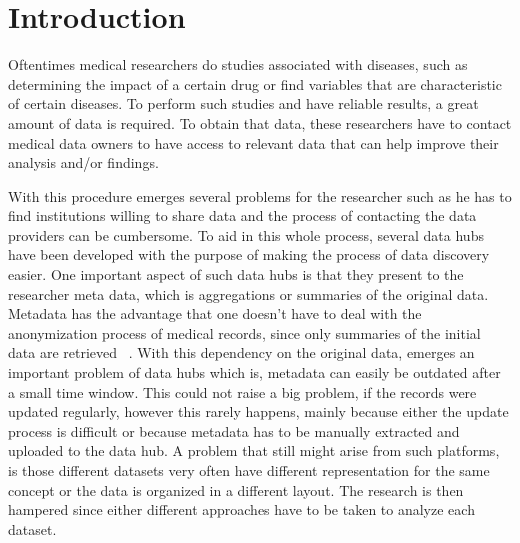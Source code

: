 \chapter{Introduction}
\label{chapter:introduction}

Oftentimes medical researchers do studies associated with diseases, such as determining the impact of a certain drug or find variables that are characteristic of certain diseases.
To perform such studies and have reliable results, a great amount of data is required.
To obtain that data, these researchers have to contact medical data owners to have access to relevant data that can help improve their analysis and/or findings.

With this procedure emerges several problems for the researcher such as he has to find
institutions willing to share data and the process of contacting the data providers can
be cumbersome.
To aid in this whole process, several data hubs have been developed with the purpose of
making the process of data discovery easier.
One important aspect of such data hubs is that they present to the researcher meta
data, which is aggregations or summaries of the original data.
Metadata has the advantage that one doesn't have to deal with the anonymization process
of medical records, since only summaries of the initial data are retrieved
~\cite{egenvar, montra}.
With this dependency on the original data, emerges an important problem of data hubs
which is, metadata can easily be outdated after a small time window.
This could not raise a big problem, if the records were updated regularly, however this
rarely happens, mainly because either the update process is difficult or because
metadata has to be manually extracted and uploaded to the data hub.
A problem that still might arise from such platforms, is those different datasets very
often have different representation for the same concept or the data is organized in a
different layout.
The research is then hampered since either different approaches have to be taken to
analyze each dataset.

